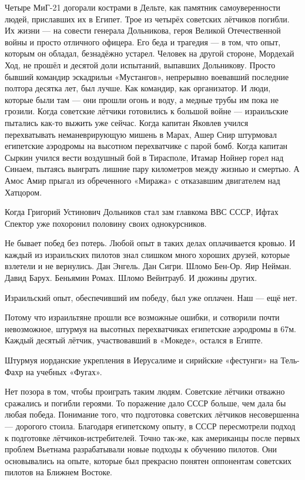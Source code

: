 Четыре МиГ-21 догорали кострами в Дельте, как памятник самоуверенности людей, приславших их в Египет. Трое из четырёх советских лётчиков погибли. Их жизни — на совести генерала Дольникова, героя Великой Отечественной войны и просто отличного офицера. Его беда и трагедия — в том, что опыт, которым он обладал, безнадёжно устарел. Человек на другой стороне, Мордехай Ход, не прошёл и десятой доли испытаний, выпавших Дольникову. Просто бывший командир эскадрильи «Мустангов», непрерывно воевавший последние полтора десятка лет, был лучше. Как командир, как организатор. И люди, которые были там — они прошли огонь и воду, а медные трубы им пока не грозили. Когда советские лётчики готовились к большой войне — израильские пытались как-то выжить уже сейчас. Когда капитан Яковлев учился перехватывать неманеврирующую мишень в Марах, Ашер Снир штурмовал египетские аэродромы на высотном перехватчике с парой бомб. Когда капитан Сыркин учился вести воздушный бой в Тирасполе, Итамар Нойнер горел над Синаем, пытаясь выиграть лишние пару километров между жизнью и смертью. А Амос Амир прыгал из обреченного «Миража» с отказавшим двигателем над Хатцором.

Когда Григорий Устинович Дольников стал зам главкома ВВС СССР, Ифтах Спектор уже похоронил половину своих однокурсников.

Не бывает побед без потерь. Любой опыт в таких делах оплачивается кровью. И каждый из израильских пилотов знал слишком много хороших друзей, которые взлетели и не вернулись. Дан Энгель. Дан Сигри. Шломо Бен-Ор. Яир Нейман. Давид Барух. Беньямин Ромах. Шломо Вейнтрауб. И дюжины других.

Израильский опыт, обеспечивший им победу, был уже оплачен. Наш — ещё нет.

Потому что израильтяне прошли все возможные ошибки, и сотворили почти невозможное, штурмуя на высотных перехватчиках египетские аэродромы в 67м. Каждый десятый лётчик, участвовавший в «Мокеде», остался в Египте.

Штурмуя иорданские укрепления в Иерусалиме и сирийские «фестунги» на Тель-Фахр на учебных «Фугах».

Нет позора в том, чтобы проиграть таким людям. Советские лётчики отважно сражались и погибли героями. То поражение дало СССР больше, чем дала бы любая победа. Понимание того, что подготовка советских лётчиков несовершенна — дорогого стоила. Благодаря египетскому опыту, в СССР пересмотрели подход к подготовке лётчиков-истребителей. Точно так-же, как американцы после первых проблем Вьетнама разрабатывали новые подходы к обучению пилотов. Они основывались на опыте, которые был прекрасно понятен оппонентам советских пилотов на Ближнем Востоке.

